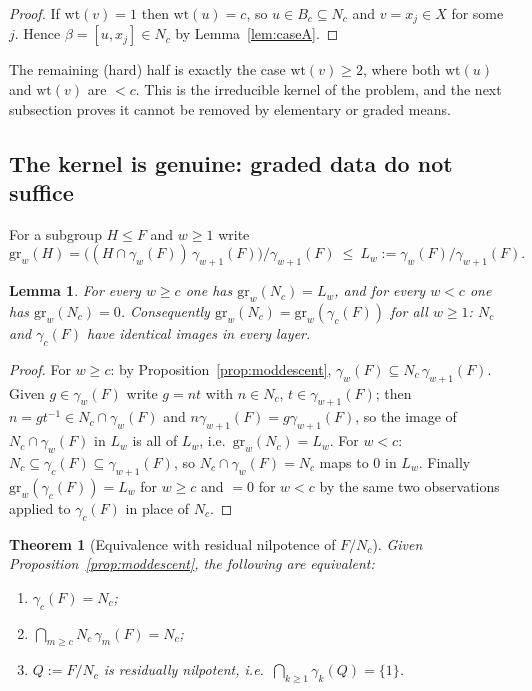 \documentclass{amsart}
\newtheorem{theorem}{Theorem}
\newtheorem{lemma}{Lemma}
\theoremstyle{definition}
\theoremstyle{remark}
\begin{document}
\begin{proof}
If $\mathrm{wt}(v)=1$ then $\mathrm{wt}(u)=c$, so $u\in B_c\subseteq N_c$ and
$v=x_j\in X$ for some $j$. Hence $\beta=[u,x_j]\in N_c$ by Lemma~\ref{lem:caseA}.
\end{proof}

\noindent
The remaining (hard) half is exactly the case $\mathrm{wt}(v)\ge2$, where both
$\mathrm{wt}(u)$ and $\mathrm{wt}(v)$ are $<c$. This is the irreducible kernel of
the problem, and the next subsection proves it cannot be removed by elementary or
graded means.

\subsection{The kernel is genuine: graded data do not suffice}

For a subgroup $H\le F$ and $w\ge1$ write
\[
\mathrm{gr}_w(H)=\big((H\cap\gamma_w(F))\,\gamma_{w+1}(F)\big)/\gamma_{w+1}(F)
\ \le\ L_w:=\gamma_w(F)/\gamma_{w+1}(F).
\]

\begin{lemma}\label{lem:gradedNc}
For every $w\ge c$ one has $\mathrm{gr}_w(N_c)=L_w$, and for every $w<c$ one has
$\mathrm{gr}_w(N_c)=0$. Consequently $\mathrm{gr}_w(N_c)=\mathrm{gr}_w(\gamma_c(F))$
for all $w\ge1$: $N_c$ and $\gamma_c(F)$ have identical images in every layer.
\end{lemma}

\begin{proof}
For $w\ge c$: by Proposition~\ref{prop:moddescent}, $\gamma_w(F)\subseteq
N_c\,\gamma_{w+1}(F)$. Given $g\in\gamma_w(F)$ write $g=n t$ with $n\in N_c$,
$t\in\gamma_{w+1}(F)$; then $n=g t^{-1}\in N_c\cap\gamma_w(F)$ and
$n\gamma_{w+1}(F)=g\gamma_{w+1}(F)$, so the image of $N_c\cap\gamma_w(F)$ in $L_w$
is all of $L_w$, i.e.\ $\mathrm{gr}_w(N_c)=L_w$. For $w<c$:
$N_c\subseteq\gamma_c(F)\subseteq\gamma_{w+1}(F)$, so $N_c\cap\gamma_w(F)=N_c$ maps
to $0$ in $L_w$. Finally $\mathrm{gr}_w(\gamma_c(F))=L_w$ for $w\ge c$ and $=0$ for
$w<c$ by the same two observations applied to $\gamma_c(F)$ in place of $N_c$.
\end{proof}

\begin{theorem}[Equivalence with residual nilpotence of $F/N_c$]\label{thm:equiv}
Given Proposition~\ref{prop:moddescent}, the following are equivalent:
\begin{enumerate}
\item[(a)] $\gamma_c(F)=N_c$;
\item[(b)] $\bigcap_{m\ge c} N_c\,\gamma_m(F)=N_c$;
\item[(c)] $Q:=F/N_c$ is residually nilpotent, i.e.\
$\bigcap_{k\ge1}\gamma_k(Q)=\{1\}$.
\end{enumerate}
\end{theorem}
\end{document}
